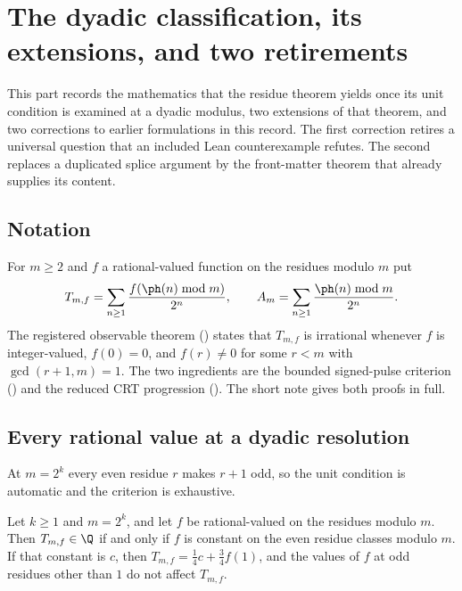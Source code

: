 \section{The dyadic classification, its extensions, and two retirements}
\label{sec:dyadic-classification-record}

This part records the mathematics that the residue theorem yields once its
unit condition is examined at a dyadic modulus, two extensions of that
theorem, and two corrections to earlier formulations in this record. The
first correction retires a universal question that an included Lean
counterexample refutes. The second replaces a duplicated splice argument by
the front-matter theorem that already supplies its content.

\subsection{Notation}

For $m\ge2$ and $f$ a rational-valued function on the residues modulo $m$ put
\[
  T_{m,f}=\sum_{n\ge1}\frac{f(\ph(n)\bmod m)}{2^n},
  \qquad
  A_m=\sum_{n\ge1}\frac{\ph(n)\bmod m}{2^n}.
\]
The registered observable theorem
()
states that $T_{m,f}$ is irrational whenever $f$ is integer-valued, $f(0)=0$,
and $f(r)\ne0$ for some $r<m$ with $\gcd(r+1,m)=1$. 
The two ingredients are the bounded signed-pulse criterion
()
and the reduced CRT progression
().
The short note gives both proofs in full.

\subsection{Every rational value at a dyadic resolution}

At $m=2^k$ every even residue $r$ makes $r+1$ odd, so the unit condition is
automatic and the criterion is exhaustive.

\begin{thm}\label{thm:dyadic-classification}
Let $k\ge1$ and $m=2^k$, and let $f$ be rational-valued on the residues
modulo $m$. Then $T_{m,f}\in\Q$ if and only if $f$ is constant on the even
residue classes modulo $m$. If that constant is $c$, then
$T_{m,f}=\frac14c+\frac34f(1)$, and the values of $f$ at odd residues other
than $1$ do not affect $T_{m,f}$.
  
\end{thm}

